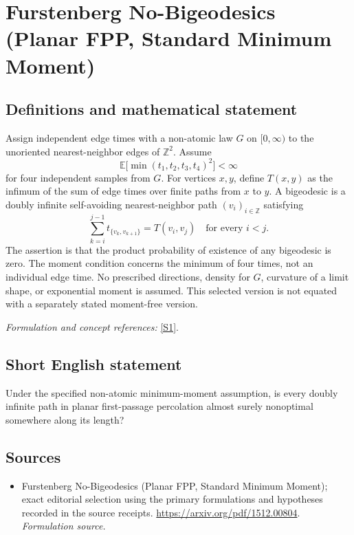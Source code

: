 \documentclass[11pt]{article}
\begin{document}
\section*{\texorpdfstring{Furstenberg No-Bigeodesics (Planar FPP, Standard Minimum Moment)}{Furstenberg No-Bigeodesics (Planar FPP, Standard Minimum Moment)}}\label{485}
\subsection{Definitions and mathematical statement}
Assign independent edge times with a non-atomic law $G$ on $[0,\infty)$ to the unoriented nearest-neighbor edges of ${\mathbb{Z}}^2$. Assume
\[
 {\mathbb{E}}\bigl[\min(t_1,t_2,t_3,t_4)^2\bigr]<\infty
\]
for four independent samples from $G$. For vertices $x,y$, define $T(x,y)$ as the infimum of the sum of edge times over finite paths from $x$ to $y$. A bigeodesic is a doubly infinite self-avoiding nearest-neighbor path $(v_i)_{i\in{\mathbb{Z}}}$ satisfying
\[
 \sum_{k=i}^{j-1}t_{\{v_k,v_{k+1}\}}=T(v_i,v_j)
 \quad\text{for every }i<j.
\]
The assertion is that the product probability of existence of any bigeodesic is zero. The moment condition concerns the minimum of four times, not an individual edge time. No prescribed directions, density for $G$, curvature of a limit shape, or exponential moment is assumed. This selected version is not equated with a separately stated moment-free version.
\par\smallskip\textit{Formulation and concept references:} \href{https://arxiv.org/pdf/1512.00804}{[S1]}.

\subsection{Short English statement}
Under the specified non-atomic minimum-moment assumption, is every doubly infinite path in planar first-passage percolation almost surely nonoptimal somewhere along its length?
\subsection{Sources}
\begin{itemize}
\item[S1]Furstenberg No-Bigeodesics (Planar FPP, Standard Minimum Moment); exact editorial selection using the primary formulations and hypotheses recorded in the source receipts.
\url{https://arxiv.org/pdf/1512.00804}.
\textit{Formulation source.}
\end{itemize}
\end{document}
